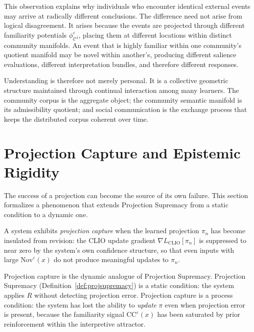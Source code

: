 \documentclass[12pt, a4paper, oneside]{book}
\newcommand{\C}{\mathcal{C}}
\newcommand{\proj}{\pi}
\newcommand{\Nov}{\mathrm{Nov}}
\newcommand{\CC}{\mathrm{CC}}
\newcommand{\phiCe}{\phi_{\C}^{\varepsilon}}
\begin{document}
\begin{remark}
This observation explains why individuals who encounter identical external
events may arrive at radically different conclusions. The difference need
not arise from logical disagreement. It arises because the events are
projected through different familiarity potentials $\phiCe_i$, placing
them at different locations within distinct community manifolds. An event
that is highly familiar within one community's quotient manifold may be
novel within another's, producing different salience evaluations,
different interpretation bundles, and therefore different responses.

Understanding is therefore not merely personal. It is a collective
geometric structure maintained through continual interaction among many
learners. The community corpus is the aggregate object; the community
semantic manifold is its admissibility quotient; and social communication
is the exchange process that keeps the distributed corpus coherent over
time.
\end{remark}

\section{Projection Capture and Epistemic Rigidity}
\label{sec:projection-capture}

The success of a projection can become the source of its own failure.
This section formalizes a phenomenon that extends Projection Supremacy
from a static condition to a dynamic one.

\begin{definition}
\label{def:projection-capture}
A system exhibits \emph{projection capture} when the learned projection
$\proj_n$ has become insulated from revision: the CLIO update gradient
$\nabla L_{\mathrm{CLIO}}[\proj_n]$ is suppressed to near zero by the
system's own confidence structure, so that even inputs with large
$\Nov^\varepsilon(x)$ do not produce meaningful updates to $\proj_n$.
\end{definition}

\begin{proposition}
\label{prop:capture-dynamic}
Projection capture is the dynamic analogue of Projection Supremacy.
Projection Supremacy (Definition~\ref{def:projsupremacy}) is a static
condition: the system applies $R$ without detecting projection error.
Projection capture is a process condition: the system has lost the
ability to \emph{update} $\proj$ even when projection error is present,
because the familiarity signal $\CC^\varepsilon(x)$ has been saturated
by prior reinforcement within the interpretive attractor.
\end{proposition}
\end{document}
